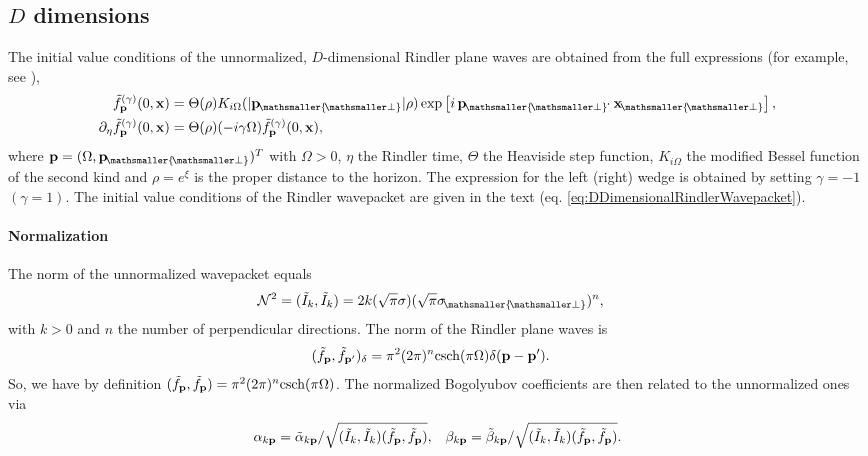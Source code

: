 \documentclass[11pt, a4paper]{article}
\def\bx{{\bf x}}
\def\bp{{\bf p}}
\newcommand{\Om}{\Omega}
\newcommand{\be}{\beta}
\newcommand{\al}{\alpha}
\newcommand{\si}{{\sigma}}
\newcommand{\del}{{\partial}}
\newcommand{\mc}[1]{\mathcal{#1}}
\newcommand{\csch}{\mathrm{csch}}
\let\perptmp\perp
\renewcommand{\perp}{{\! \mathsmaller{\perptmp}}}
\begin{document}
\subsection{$D$ dimensions}
\label{sec:calcRindlerDdimensions}
The initial value conditions of the unnormalized, $D$-dimensional Rindler plane waves are obtained from the full expressions (for example, see \cite{Takagi}),
\begin{equation}\label{eq:initialValueConditionsOfDDimensionalRindlerPlaneWaves}
\begin{aligned}
\tilde	f_\bp^{(\gamma)}(0,\bx)&=\Theta(\rho)K_{i\Om}(|\bp_\perp|\rho)\exp\left[i\,\bp_\perp\!\! \cdot \bx_\perp\right],\\
\del_{\eta}\tilde f_\bp^{(\gamma)}(0,\bx)&=\Theta(\rho)(-i\gamma \Om) 	\tilde f_\bp^{(\gamma)}(0,\bx),
\end{aligned}
\end{equation}
where $\bp=(\Om,\bp_\perp)^T$ with $\Om> 0$,  $\eta$ the Rindler time, $\Theta$ the Heaviside step function, $K_{i\Om}$ the modified Bessel function of the second kind and $\rho=e^{\xi}$ is the proper distance to the horizon. The expression for the left (right) wedge is obtained by setting $\gamma=-1$ $(\gamma=1)$. The initial value conditions of the Rindler wavepacket are given in the text (eq. \ref{eq:DDimensionalRindlerWavepacket}).

\paragraph{Normalization}
The norm of the unnormalized wavepacket equals
\begin{align*}
\mc N^2 = (\tilde I_k,\tilde I_k)&=2 k  (\sqrt{\pi}\si )(\sqrt{\pi}\si_\perp)^n,
\end{align*}
with $k>0$ and $n$ the number of perpendicular directions.
The norm of the Rindler plane waves is 
\begin{align*}
(\tilde f_\bp,\tilde f_{\bp'})_\delta&=\pi^2(2\pi)^n \csch(\pi\Om) \delta(\bp-\bp').
\end{align*}
So, we have by definition $(\tilde f_\bp,\tilde f_{\bp})=\pi^2(2\pi)^n \csch(\pi\Om)$. The normalized Bogolyubov coefficients are then related to the unnormalized ones via
\begin{align*}
\al_{k\bp}=\tilde \al_{k\bp}/\sqrt{(\tilde I_k,\tilde I_k)(\tilde f_\bp,\tilde f_\bp)},&& \be_{k\bp}=\tilde \be_{k\bp}/\sqrt{(\tilde I_k,\tilde I_k)(\tilde f_\bp,\tilde f_\bp)}.
\end{align*}
\end{document}
